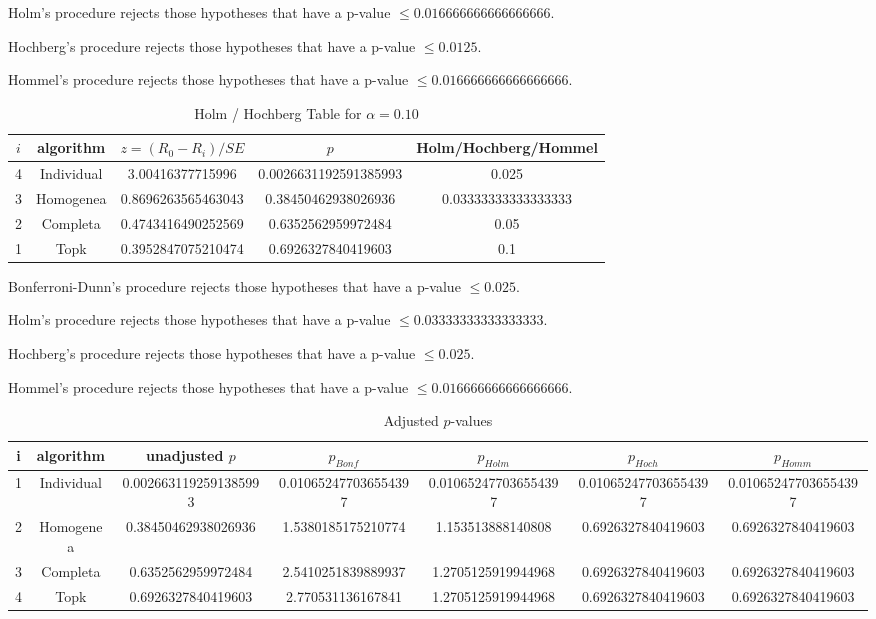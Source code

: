 \documentclass[a4paper,10pt]{article}
\begin{document}
\begin{landscape}
Holm's procedure rejects those hypotheses that have a p-value $\le0.016666666666666666$.


Hochberg's procedure rejects those hypotheses that have a p-value $\le0.0125$.


Hommel's procedure rejects those hypotheses that have a p-value $\le0.016666666666666666$.


\begin{table}[!htp]
\centering\tiny
\caption{Holm / Hochberg Table for $\alpha=0.10$}
\begin{tabular}{ccccc}
$i$&algorithm&$z=(R_0 - R_i)/SE$&$p$&Holm/Hochberg/Hommel\\
\hline
4&Individual&3.00416377715996&0.0026631192591385993&0.025\\
3&Homogenea&0.8696263565463043&0.38450462938026936&0.03333333333333333\\
2&Completa&0.4743416490252569&0.6352562959972484&0.05\\
1&Topk&0.3952847075210474&0.6926327840419603&0.1\\
\hline
\end{tabular}
\end{table}
Bonferroni-Dunn's procedure rejects those hypotheses that have a p-value $\le0.025$.


Holm's procedure rejects those hypotheses that have a p-value $\le0.03333333333333333$.


Hochberg's procedure rejects those hypotheses that have a p-value $\le0.025$.


Hommel's procedure rejects those hypotheses that have a p-value $\le0.016666666666666666$.


\begin{table}[!htp]
\centering\tiny
\caption{Adjusted $p$-values}
\begin{tabular}{ccccccc}
i&algorithm&unadjusted $p$&$p_{Bonf}$&$p_{Holm}$&$p_{Hoch}$&$p_{Homm}$\\
\hline
1&Individual&0.0026631192591385993&0.010652477036554397&0.010652477036554397&0.010652477036554397&0.010652477036554397\\
2&Homogenea&0.38450462938026936&1.5380185175210774&1.153513888140808&0.6926327840419603&0.6926327840419603\\
3&Completa&0.6352562959972484&2.5410251839889937&1.2705125919944968&0.6926327840419603&0.6926327840419603\\
4&Topk&0.6926327840419603&2.770531136167841&1.2705125919944968&0.6926327840419603&0.6926327840419603\\
\hline
\end{tabular}
\end{table}


\end{landscape}
\end{document}
